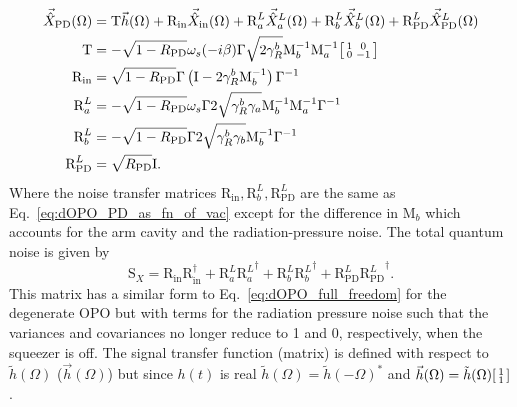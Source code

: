 \begin{align}
\vec{\hat X}_\mathrm{PD}(\Omega)&=\text{T}\vec h(\Omega)+\text{R}_\text{in}\vec{\hat X}_\mathrm{in}(\Omega)+\text{R}^L_a\vec{\hat X}^L_a(\Omega)+\text{R}^L_b\vec{\hat X}^L_b(\Omega)+\text{R}^L_\text{PD}\vec{\hat X}^L_\text{PD}(\Omega)\\
\text{T}&=-\sqrt{1-R_\text{PD}}\omega_s(-i\beta)\Gamma \sqrt{2\gamma^b_R}\text{M}_b^{-1}\text{M}_a^{-1}\begin{bsmallmatrix}1 & 0 \\0 & -1\end{bsmallmatrix}\\
\text{R}_\text{in}&=\sqrt{1-R_\text{PD}}\Gamma\left(\text{I}-2\gamma^b_R\text{M}_b^{-1}\right)\Gamma^{-1}\\
\text{R}^L_a&=-\sqrt{1-R_\text{PD}}\omega_s\Gamma 2\sqrt{\gamma^b_R \gamma_a}\text{M}_b^{-1}\text{M}_a^{-1}\Gamma^{-1}\\
\text{R}^L_b&=-\sqrt{1-R_\text{PD}}\Gamma 2\sqrt{\gamma^b_R \gamma_b}\text{M}_b^{-1}\Gamma^{-1}\\
\text{R}^L_\text{PD}&=\sqrt{R_\text{PD}} \text{I}.
\end{align}
Where the noise transfer matrices $\text{R}_\text{in},\text{R}^L_b,\text{R}^L_\text{PD}$ are the same as Eq.~\ref{eq:dOPO_PD_as_fn_of_vac} except for the difference in $\text{M}_b$ which accounts for the arm cavity and the radiation-pressure noise. %
The total quantum noise is given by %
\begin{equation}
\text{S}_X=\text{R}_\text{in}\text{R}_\text{in}^\dag+\text{R}^L_a{\text{R}^L_a}^\dag+\text{R}^L_b{\text{R}^L_b}^\dag+\text{R}^L_\text{PD}{\text{R}^L_\text{PD}}^\dag.
\end{equation}
This matrix has a similar form to Eq.~\ref{eq:dOPO_full_freedom} for the degenerate OPO but with terms for the radiation pressure noise such that the variances and covariances no longer reduce to 1 and 0, respectively, when the squeezer is off. 
The signal transfer function (matrix) is defined with respect to $\tilde h(\Omega)$ ($\vec h(\Omega)$) but since $h(t)$ is real $\tilde h(\Omega)=\tilde h(-\Omega)^*$ and $\vec h(\Omega)=\tilde h(\Omega) \begin{bsmallmatrix}1 \\1\end{bsmallmatrix}$.
